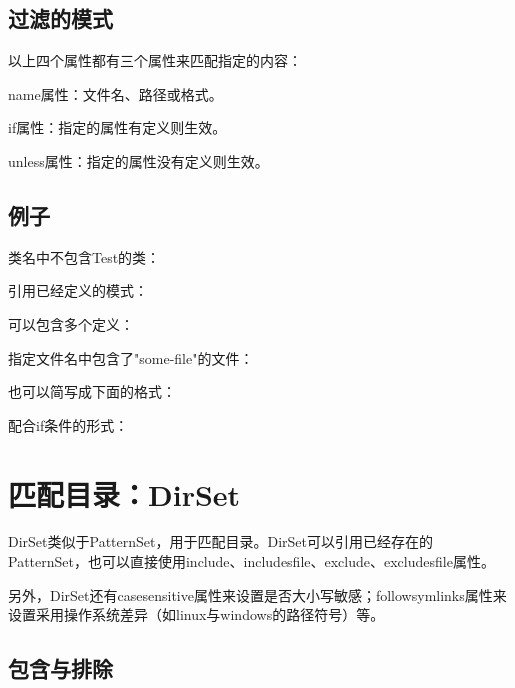 	\subsection{过滤的模式}

		以上四个属性都有三个属性来匹配指定的内容：

		name属性：文件名、路径或格式。

		if属性：指定的属性有定义则生效。

		unless属性：指定的属性没有定义则生效。


	\subsection{例子}

		类名中不包含Test的类：

		

		引用已经定义的模式：

		

		可以包含多个定义：

		

		指定文件名中包含了"some-file"的文件：

		

		也可以简写成下面的格式：

		

		配合if条件的形式：

		

\section{匹配目录：DirSet}

	DirSet类似于PatternSet，用于匹配目录。DirSet可以引用已经存在的PatternSet，也可以直接使用include、includesfile、exclude、excludesfile属性。

	另外，DirSet还有casesensitive属性来设置是否大小写敏感；followsymlinks属性来设置采用操作系统差异（如linux与windows的路径符号）等。

	\subsection{包含与排除}

